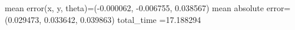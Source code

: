 mean error(x, y, theta)=(-0.000062, -0.006755, 0.038567)
mean absolute error=(0.029473, 0.033642, 0.039863)
total_time =17.188294